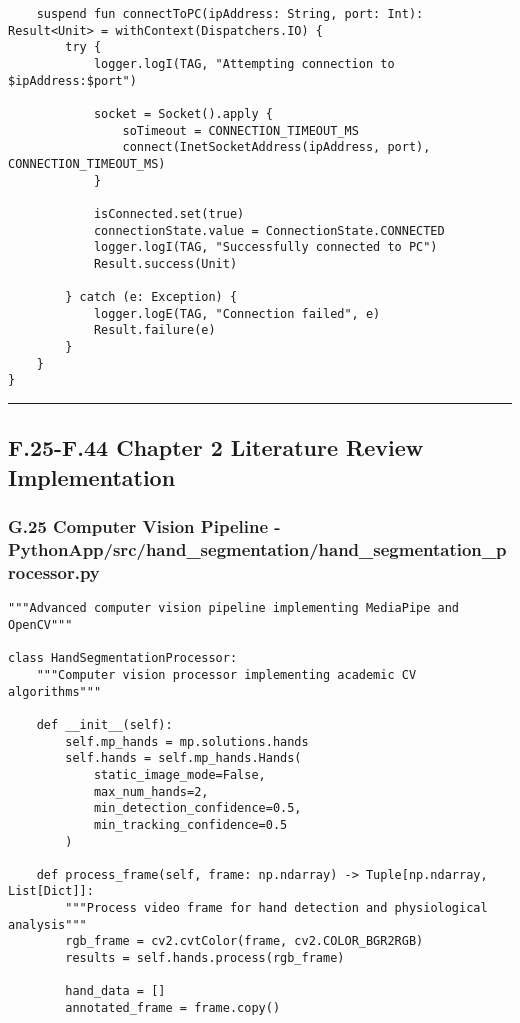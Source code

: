 \documentclass[12pt,a4paper]{article}
\begin{document}
{{\begin{verbatim}
    suspend fun connectToPC(ipAddress: String, port: Int): Result<Unit> = withContext(Dispatchers.IO) {
        try {
            logger.logI(TAG, "Attempting connection to $ipAddress:$port")
            
            socket = Socket().apply {
                soTimeout = CONNECTION_TIMEOUT_MS
                connect(InetSocketAddress(ipAddress, port), CONNECTION_TIMEOUT_MS)
            }
            
            isConnected.set(true)
            connectionState.value = ConnectionState.CONNECTED
            logger.logI(TAG, "Successfully connected to PC")
            Result.success(Unit)
            
        } catch (e: Exception) {
            logger.logE(TAG, "Connection failed", e)
            Result.failure(e)
        }
    }
}
\end{verbatim}

\hrule

\subsection{F.25-F.44 Chapter 2 Literature Review Implementation}

\subsubsection{G.25 Computer Vision Pipeline - PythonApp/src/hand_segmentation/hand_segmentation_processor.py}

\begin{verbatim}
"""Advanced computer vision pipeline implementing MediaPipe and OpenCV"""

class HandSegmentationProcessor:
    """Computer vision processor implementing academic CV algorithms"""
    
    def __init__(self):
        self.mp_hands = mp.solutions.hands
        self.hands = self.mp_hands.Hands(
            static_image_mode=False,
            max_num_hands=2,
            min_detection_confidence=0.5,
            min_tracking_confidence=0.5
        )
        
    def process_frame(self, frame: np.ndarray) -> Tuple[np.ndarray, List[Dict]]:
        """Process video frame for hand detection and physiological analysis"""
        rgb_frame = cv2.cvtColor(frame, cv2.COLOR_BGR2RGB)
        results = self.hands.process(rgb_frame)
        
        hand_data = []
        annotated_frame = frame.copy()
        

\end{verbatim}}}
\end{document}
